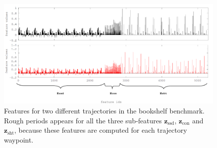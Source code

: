 \documentclass[letterpaper, 10 pt, conference]{ieeeconf}  %
\newcommand{\fssd}{\mbox{$\mathbf z_{\text{ssd}}$}}
\newcommand{\fcon}{\mbox{$\mathbf z_{\text{con}}$}}
\newcommand{\fsht}{\mbox{$\mathbf z_{\text{sht}}$}}
\begin{document}
\begin{figure}[t]
\centering
\includegraphics[width=0.8\linewidth]{figure/features.pdf}
\caption{Features for two different trajectories in the bookshelf benchmark. Rough periods appears for all the three sub-features $\fssd$, $\fcon$ and $\fsht$, because these features are computed for each trajectory waypoint.}
\label{fig:features}
\end{figure}
\end{document}
